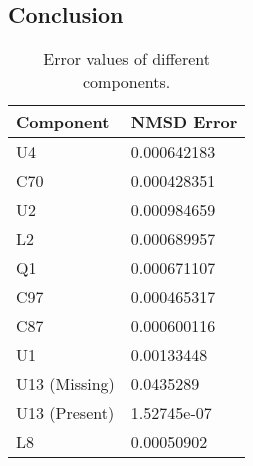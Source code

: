 \documentclass[conference]{IEEEtran}
\begin{document}
\subsection{Conclusion}

\begin{table}[]
\caption{Error values of different components.}
\label{tab:t3error}
\begin{tabular}{|l|l|}
\hline
\textbf{Component} & \textbf{NMSD Error} \\ \hline
U4                 & 0.000642183         \\ \hline
C70                & 0.000428351         \\ \hline
U2                 & 0.000984659         \\ \hline
L2                 & 0.000689957         \\ \hline
Q1                 & 0.000671107         \\ \hline
C97                & 0.000465317         \\ \hline
C87                & 0.000600116         \\ \hline
U1                 & 0.00133448          \\ \hline
U13 (Missing)      & 0.0435289           \\ \hline
U13 (Present)      & 1.52745e-07         \\ \hline
L8                 & 0.00050902          \\ \hline
\end{tabular}
\end{table}


%
%
\end{document}
